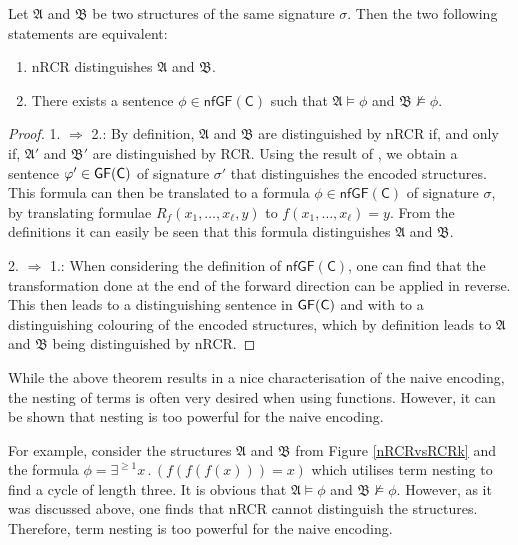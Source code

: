 \begin{theorem}
	\label{thm:ThmA}
	Let $\mathfrak A$ and $\mathfrak B$ be two structures of the same signature $\sigma$.
	Then the two following statements are equivalent:
	\begin{enumerate}
		\item nRCR distinguishes $\mathfrak A$ and $\mathfrak B$.
		\item There exists a sentence $\phi\in \mathsf{nfGF}(\mathsf C)$ such that $\mathfrak A\models \phi$ and $\mathfrak B\not\models \phi$.
	\end{enumerate}
\end{theorem}
\begin{proof}
	1. $\Rightarrow$ 2.:
	By definition, $\mathfrak A$ and $\mathfrak B$ are distinguished by nRCR if, and only if, $\mathfrak A'$ and $\mathfrak B'$ are distinguished by RCR.
	Using the result of \cite{scheidt2025ColorRefinement}, we obtain a sentence $\varphi'\in\mathsf{GF}(\mathsf{C})$ of signature $\sigma'$ that distinguishes the encoded structures.
	This formula can then be translated to a formula $\phi\in \mathsf{nfGF}(\mathsf C)$ of signature $\sigma$, by translating formulae $R_f(x_1,\dots,x_\ell,y)$ to $f(x_1,\dots,x_\ell)=y$.
	From the definitions it can easily be seen that this formula distinguishes $\mathfrak A$ and $\mathfrak B$.
	
	2. $\Rightarrow$ 1.:
	When considering the definition of $\mathsf{nfGF}(\mathsf C)$, one can find that the transformation done at the end of the forward direction can be applied in reverse.
	This then leads to a distinguishing sentence in $\mathsf{GF}(\mathsf{C})$ and with \cite{scheidt2025ColorRefinement} to a distinguishing colouring of the encoded structures, which by definition leads to $\mathfrak A$ and $\mathfrak B$ being distinguished by nRCR.
\end{proof}

While the above theorem results in a nice characterisation of the naive encoding, the nesting of terms is often very desired when using functions.
However, it can be shown that nesting is too powerful for the naive encoding.

For example, consider the structures $\mathfrak A$ and $\mathfrak B$ from Figure \ref{nRCRvsRCRk} and the formula $\phi=\exists^{\geq 1} x\operatorname{.}(f(f(f(x)))=x)$ which utilises term nesting to find a cycle of length three.
It is obvious that $\mathfrak A \models \phi$ and $\mathfrak B\not\models \phi$.
However, as it was discussed above, one finds that nRCR cannot distinguish the structures.
Therefore, term nesting is too powerful for the naive encoding.


